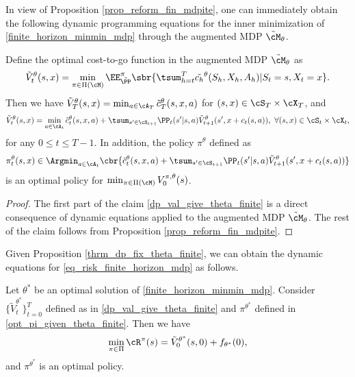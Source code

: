 \documentclass[9pt]{article}
\numberwithin{equation}{section}
\begin{document}
In view of Proposition \ref{prop_reform_fin_mdpite}, one can immediately obtain the following dynamic programming equations for the inner minimization of  \eqref{finite_horizon_minmin_mdp}  through the augmented MDP $\tilde{\cM}_\theta$.



\begin{proposition}\label{thrm_dp_fix_theta_finite}
    Define the optimal cost-to-go function in the augmented MDP $\tilde{\cM}_\theta$ as 
    \begin{align*}
        \tilde{V}_t^\theta (s, x) = 
        \min_{\pi \in \Pi(\cM)}
        \EE^{\pi}_{\tilde{\PP}} 
        \sbr{
        \tsum_{h=t}^T \tilde{c_h}^\theta(S_h, X_h, A_h) | S_t = s, X_t = x
        }.
    \end{align*}
    Then we have 
    $\tilde{V}_T^\theta(s,x) = \min_{a \in \cA_T} \tilde{c}_T^\theta(s, x, a)$ for $(s,x) \in \cS_T \times \cX_T$,  and 
    \begin{align}\label{dp_val_give_theta_finite}
        \tilde{V}^\theta_t(s, x) = \min_{a \in \cA_t}
        \tilde{c}_t^\theta(s, x, a) + 
        \tsum_{s' \in \cS_{t+1}} \PP_t(s'|s, a) \tilde{V}_{t+1}^\theta(s', x + c_t(s, a)),
        ~ \forall  (s, x) \in \cS_t \times \cX_t,
    \end{align}
    for any $0 \leq t \leq T-1$.
    In addition, the policy ${\pi^\theta}$ defined as 
    \begin{align}\label{opt_pi_given_theta_finite}
        \pi^\theta_t(s, x) \in \Argmin_{a \in \cA_t} \cbr{
        \tilde{c}_t^\theta(s, x, a) + 
        \tsum_{s' \in \cS_{t+1}} \PP_t(s'|s, a) \tilde{V}_{t+1}^\theta(s', x + c_t(s, a))
        }
    \end{align}
    is an optimal policy for $\min_{\pi \in \Pi(\cM)} V^{\pi, \theta}_0(s)$.
\end{proposition}

\begin{proof}
    The first part of the claim \eqref{dp_val_give_theta_finite} is a direct consequence of dynamic equations applied to the augmented MDP $\tilde{\cM}_\theta$. 
    The rest of the claim follows from Proposition \ref{prop_reform_fin_mdpite}.
\end{proof}

Given Proposition \ref{thrm_dp_fix_theta_finite}, we can obtain the dynamic equations for \eqref{eq_risk_finite_horizon_mdp} as follows.

\begin{theorem}\label{cor_dp_optimal_value_finite_mdp}
Let $\theta^*$ be an optimal solution of \eqref{finite_horizon_minmin_mdp}.
Consider $\{\tilde{V}^{\theta^*}_t\}_{t=0}^T$ defined as in \eqref{dp_val_give_theta_finite}
 and $\pi^{\theta^*}$ defined in \eqref{opt_pi_given_theta_finite}. 
 Then we have 
 \begin{align*}
     \min_{\pi \in \Pi} \cR^\pi(s) = \tilde{V}^{\theta^*}_0(s, 0) + f_{\theta^*}(0), 
 \end{align*}
 and $\pi^{\theta^*}$ is an optimal policy.
\end{theorem}
\end{document}
